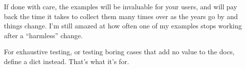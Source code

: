 If done with care, the examples will be invaluable for your users, and
will pay back the time it takes to collect them many times over as the
years go by and things change.  I'm still amazed at how often one of
my  examples stops working after a ``harmless''
change.

For exhaustive testing, or testing boring cases that add no value to the
docs, define a  dict instead.  That's what it's for.

